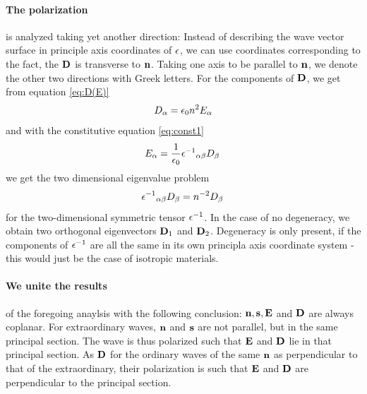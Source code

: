 \paragraph{The polarization} is analyzed taking yet another direction: 
Instead of describing the wave vector surface in principle axis 
coordinates of $\epsilon$, we can use coordinates corresponding to 
the fact, the $\mathbf{D}$ is transverse to $\mathbf{n}$. Taking one axis to be 
parallel to $\mathbf{n}$, we denote the other two directions with Greek letters. 
For the components of $\mathbf{D}$, we get from equation \eqref{eq:D(E)}
\begin{equation}
    D_\alpha = \epsilon_0 n^2 E_\alpha
\end{equation}
and with the constitutive equation \eqref{eq:const1} 
\begin{equation}
    E_\alpha = \frac{1}{\epsilon_0} {\epsilon^{-1}}_{\alpha \beta} D_\beta \, 
\end{equation}
we get the two dimensional eigenvalue problem
\begin{equation}
    {\epsilon^{-1}}_{\alpha \beta} D_\beta =  n^{-2} D_\beta \,
\end{equation}
for the two-dimensional symmetric tensor $\epsilon^{-1}$. 
In the case of no degeneracy, we obtain two orthogonal eigenvectors 
$\mathbf{D}_1$ and $\mathbf{D}_2$. Degeneracy is only present, if the components of 
$\epsilon^{-1}$ are all the same in its own principla axis coordinate system - 
this would just be the case of isotropic materials. 


\paragraph{We unite the results} of the foregoing anaylsis with the 
following conclusion: 
$\mathbf{n}, \mathbf{s}, \mathbf{E}$ and $\mathbf{D}$ are always coplanar. For extraordinary waves, 
$\mathbf{n}$ and $\mathbf{s}$ are not parallel, but in the same principal section. 
The wave is thus polarized such that $\mathbf{E}$ and $\mathbf{D}$ lie in that principal 
section. As $\mathbf{D}$ for the ordinary waves of the same $\mathbf{n}$ as perpendicular 
to that of the extraordinary, their polarization is such that 
$\mathbf{E}$ and $\mathbf{D}$ are perpendicular to the principal section. 


